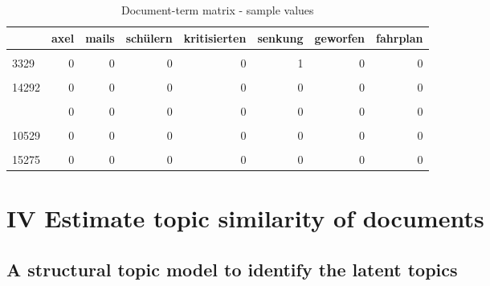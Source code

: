 \documentclass[
]{article}
\begin{document}
\begin{table}[H]

\caption{\label{tab:Document term matrix}Document-term matrix - sample values \label{table:dtm}}
\centering
\fontsize{7}{9}\selectfont
\begin{tabular}[t]{lrrrrrrr}
\toprule
  & axel & mails & schülern & kritisierten & senkung & geworfen & fahrplan\\
\midrule
\cellcolor{gray!6}{18125} & \cellcolor{gray!6}{0} & \cellcolor{gray!6}{0} & \cellcolor{gray!6}{0} & \cellcolor{gray!6}{0} & \cellcolor{gray!6}{0} & \cellcolor{gray!6}{0} & \cellcolor{gray!6}{0}\\
3329 & 0 & 0 & 0 & 0 & 1 & 0 & 0\\
\cellcolor{gray!6}{11778} & \cellcolor{gray!6}{0} & \cellcolor{gray!6}{0} & \cellcolor{gray!6}{0} & \cellcolor{gray!6}{0} & \cellcolor{gray!6}{0} & \cellcolor{gray!6}{0} & \cellcolor{gray!6}{0}\\
14292 & 0 & 0 & 0 & 0 & 0 & 0 & 0\\
\cellcolor{gray!6}{1077} & \cellcolor{gray!6}{0} & \cellcolor{gray!6}{0} & \cellcolor{gray!6}{0} & \cellcolor{gray!6}{0} & \cellcolor{gray!6}{0} & \cellcolor{gray!6}{0} & \cellcolor{gray!6}{0}\\
\addlinespace
15568 & 0 & 0 & 0 & 0 & 0 & 0 & 0\\
\cellcolor{gray!6}{15392} & \cellcolor{gray!6}{0} & \cellcolor{gray!6}{0} & \cellcolor{gray!6}{0} & \cellcolor{gray!6}{0} & \cellcolor{gray!6}{0} & \cellcolor{gray!6}{0} & \cellcolor{gray!6}{0}\\
10529 & 0 & 0 & 0 & 0 & 0 & 0 & 0\\
\cellcolor{gray!6}{6777} & \cellcolor{gray!6}{0} & \cellcolor{gray!6}{0} & \cellcolor{gray!6}{0} & \cellcolor{gray!6}{0} & \cellcolor{gray!6}{0} & \cellcolor{gray!6}{0} & \cellcolor{gray!6}{0}\\
15275 & 0 & 0 & 0 & 0 & 0 & 0 & 0\\
\bottomrule
\end{tabular}
\end{table}

\hypertarget{iv-estimate-topic-similarity-of-documents}{%
\section{IV Estimate topic similarity of
documents}\label{iv-estimate-topic-similarity-of-documents}}

\hypertarget{a-structural-topic-model-to-identify-the-latent-topics}{%
\subsection{A structural topic model to identify the latent
topics}\label{a-structural-topic-model-to-identify-the-latent-topics}}
\end{document}
